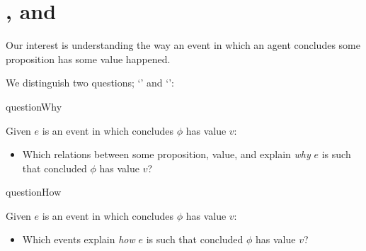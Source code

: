 \section*{\qWhy{}, \qHow{} and \issueInclusion{}}
\label{cha:intro:why-how}

\begin{note}
  Our interest is understanding the way an event in which an agent concludes some proposition has some value happened.

  We distinguish two questions; `\qWhy{}' and `\qHow{}':

  \begin{question}{questionWhy}{\qWhy{}}
    \medskip

    Given \(e\) is an event in which \vAgent{} concludes \(\phi\) has value \(v\):
    \begin{itemize}
    \item
      Which relations between some proposition, value, and \pool{} explain \emph{why} \(e\) is such that \vAgent{} concluded \(\phi\) has value \(v\)?
    \end{itemize}
    \vspace{-\baselineskip}
  \end{question}

  \begin{question}{questionHow}{\qHow{}}
    \label{q:how}
    \medskip

    Given \(e\) is an event in which \vAgent{} concludes \(\phi\) has value \(v\):
    \begin{itemize}
    \item
      Which events explain \emph{how} \(e\) is such that \vAgent{} concluded \(\phi\) has value \(v\)?
    \end{itemize}
    \vspace{-\baselineskip}
  \end{question}
\end{note}


